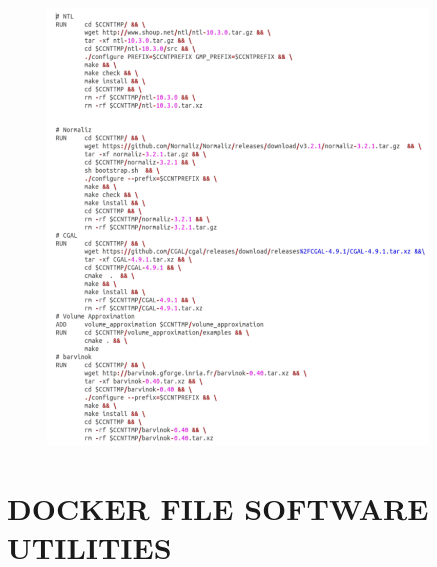 \documentclass[12pt,twoside]{article}
\begin{document}
	\begin{figure}[!h]
  		\centering
         	\includegraphics[width=0.90\textwidth]{softtool.png}
		
	\end{figure}	
	
\newpage
\section{DOCKER FILE SOFTWARE UTILITIES}
\end{document}
